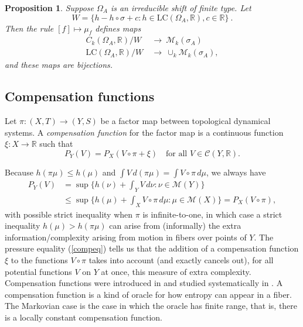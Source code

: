 \documentclass{kepart2010}
\theoremstyle{plain}
\newtheorem{prop}[thm]{Proposition}
\theoremstyle{definition}
\theoremstyle{remark}
\theoremstyle{definition}
\numberwithin{equation}{section}
\begin{document}
\begin{prop}\cite{ParryTuncel1982-2} \label{markovasfunctions}
Suppose  $\Omega_A$ is an irreducible shift of finite type. Let \begin{equation}
W=\{h-h\circ \sigma+ c: h \in \text{LC}(\Omega_A,\mathbb R ),
c\in{\mathbb R}\}\ .
\end{equation}
Then the rule $[f]\mapsto \mu_f$ defines maps
\begin{align*}
C_k(\Omega_A,\mathbb R)/W \ &\to \ \mathcal M_k(\sigma_A) \  \\
\text{LC}(\Omega_A,\mathbb R)/W \ &\to \ \cup_k \mathcal
M_k(\sigma_A),
\end{align*}
and these maps are bijections.
\end{prop}

\subsection{Compensation functions}

Let $\pi : (X,T) \to (Y,S)$ be a factor map between topological
dynamical systems. A {\em compensation function} for the factor map
is a continuous function $\xi:X \to \mathbb R$ such that
\begin{equation}\label{compeq}
P_Y(V) = P_X(V \circ \pi + \xi) \quad\text{for all } V \in {{\mathcal C}}
(Y,{\mathbb R}) .
\end{equation}

Because $h(\pi\mu) \leq h(\mu)$ and $\int V\, d(\pi \mu)
 = \int V \circ \pi
\, d\mu$,
 we always have
\begin{align}
P_Y(V) &= \sup\{ h(\nu) + \int_Y V\,d\nu : \nu \in {{\mathcal M}} (Y)
  \} \\
 &\leq  \sup\{ h(\mu) + \int_X V \circ \pi \,d\mu : \mu \in {{\mathcal M}} (X)
   \}
= P_X(V \circ \pi) ,
   \end{align}
with possible strict inequality when $\pi $ is infinite-to-one, in
which case a strict inequality $h(\mu )> h(\pi \mu)$ can arise from
(informally) the extra information/complexity arising from motion in
fibers over points of $Y$. The pressure equality (\ref{compeq})
tells us that the addition of a compensation function $\xi$ to the
functions $V\circ \pi$ takes into account (and exactly cancels out),
for all potential functions $V$ on $Y$ at once, this measure of
extra complexity. Compensation functions were introduced in
\cite{BoyleTuncel1984} and studied systematically in
\cite{Walters1986}. A compensation function is a kind of oracle for
how entropy can appear in a fiber. The Markovian case is  the case
in which the oracle has finite range, that is, there is a locally
constant compensation function.
\end{document}
